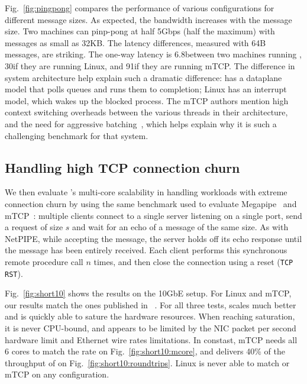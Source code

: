  Fig.~\ref{fig:pingpong} compares the performance of various
configurations for different message sizes.  As expected, the
bandwidth increases with the message size. Two \ix machines can
pinp-pong at half 5Gbps (half the maximum) with messages as small as
32KB.  The latency differences, measured with 64B messages, are
striking.  The one-way latency is 6.8\microsecond between two machines
running \ix, 30\microsecond if they are running Linux, and
91\microsecond if they are running mTCP.  The difference in system
architecture help explain such a dramatic difference: \ix has a
dataplane model that polls queues and runs them to completion; Linux
has an interrupt model, which wakes up the blocked process.  The mTCP
authors mention high context switching overheads between the various
threads in their architecture, and the need for aggressive
batching~\cite{jeong2014mtcp}, which helps explain why it is such a
challenging benchmark for that system.


\subsection{Handling high TCP connection churn}
\label{sec:eval:short}

We then evaluate \ix's multi-core scalability in handling workloads
with extreme connection churn by using the same benchmark used to evaluate
Megapipe~\cite{han2012megapipe} and mTCP~\cite{jeong2014mtcp}:
multiple clients connect to a single server listening on a single
port, send a request of size $s$ and wait for an echo of a message of
the same size.  As with NetPIPE, while accepting the message, the server holds off its
echo response until the message has been entirely received.
Each client performs this synchronous remote procedure
call $n$ times, and then close the connection using a reset
(\texttt{TCP RST}).

Fig.~\ref{fig:short10} shows the results on the 10GbE setup.  For
Linux and mTCP, our results match the ones published in
~\cite{jeong2014mtcp}.  For all three tests, \ix scales much better
and is quickly able to sature the hardware resources.  When reaching
saturation, it is never CPU-bound, and appears to be limited by the
NIC packet per second hardware limit and Ethernet wire rates limitations.  In constast, mTCP needs
all 6 cores to match the rate on Fig.~\ref{fig:short10:mcore}, and
delivers 40\% of the throughput of \ix on
Fig.~\ref{fig:short10:roundtrips}.  Linux is never able to match \ix
or mTCP on any configuration.


